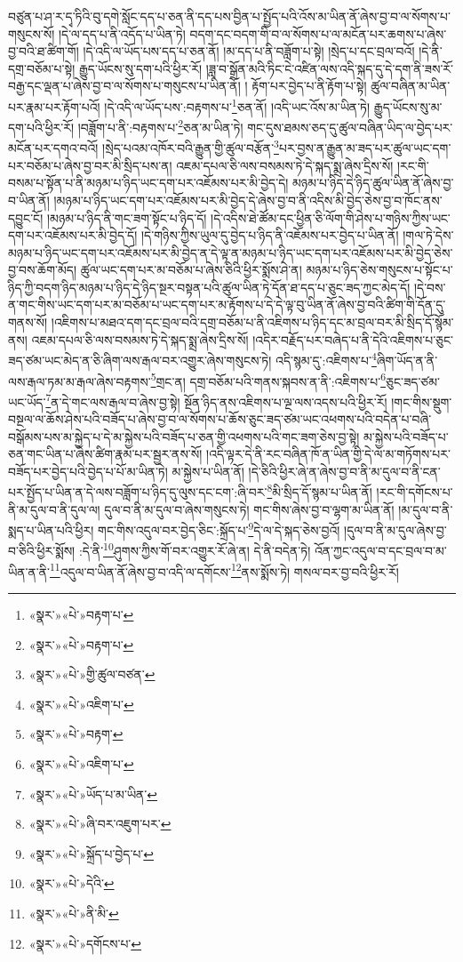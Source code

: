 བཙུན་པ་ཤ་ར་དྭ་ཏིའི་བུ་དགེ་སློང་དད་པ་ཅན་ནི་དད་པས་བྱིན་པ་སྤྱོད་པའི་འོས་མ་ཡིན་ནོ་ཞེས་བྱ་བ་ལ་སོགས་པ་གསུངས་སོ། །དེ་ལ་དད་པ་ནི་འདོད་པ་ཡིན་ཏེ། བདག་དང་བདག་གི་བ་ལ་སོགས་པ་ལ་མངོན་པར་ཆགས་པ་ཞེས་བྱ་བའི་ཐ་ཚིག་གོ། །དེ་འདི་ལ་ཡོད་པས་དད་པ་ཅན་ནོ། །མ་དད་པ་ནི་བཟློག་པ་སྟེ། །སྲེད་པ་དང་བྲལ་བའོ། །དེ་ནི་དགྲ་བཅོམ་པ་སྟེ། རྒྱུད་ཡོངས་སུ་དག་པའི་ཕྱིར་རོ། །ཟླ་བ་སྒྲོན་མའི་ཏིང་ངེ་འཛིན་ལས་འདི་སྐད་དུ་དེ་དག་ནི་ཟས་རོ་བརྒྱ་དང་ལྡན་པ་ཞེས་བྱ་བ་ལ་སོགས་པ་གསུངས་པ་ཡིན་ནོ། །
རྟོག་པར་བྱེད་པ་ནི་རྟོག་པ་སྟེ། ཚུལ་བཞིན་མ་ཡིན་པར་རྣམ་པར་རྟོག་པའོ། །དེ་འདི་ལ་ཡོད་པས་:བརྟགས་པ་\footnote{«སྣར་»«པེ་»བརྟག་པ་}ཅན་ནོ། །འདི་ཡང་འོས་མ་ཡིན་ཏེ། རྒྱུད་ཡོངས་སུ་མ་དག་པའི་ཕྱིར་རོ། །བཟློག་པ་ནི་:བརྟགས་པ་\footnote{«སྣར་»«པེ་»བརྟག་པ་}ཅན་མ་ཡིན་ཏེ། གང་དུས་ཐམས་ཅད་དུ་ཚུལ་བཞིན་ཡིད་ལ་བྱེད་པར་མངོན་པར་དགའ་བའོ། །སྲེད་པའམ་འཁོར་བའི་རྒྱུན་གྱི་ཚུལ་བརྩོན་\footnote{«སྣར་»«པེ་»གྱི་ཚུལ་བཙན་}པར་བྱས་ན་རྒྱུན་མ་ཟད་པར་ཚུལ་ཡང་དག་པར་བཅོམ་པ་ཞེས་བྱ་བར་མི་སྲིད་པས་ན། འཇམ་དཔལ་ཅི་ལས་བསམས་ཏེ་དེ་སྐད་སྨྲ་ཞེས་དྲིས་སོ། །རང་གི་བསམ་པ་སྟོན་པ་ནི་མཉམ་པ་ཉིད་ཡང་དག་པར་འཇོམས་པར་མི་བྱེད་དེ། མཉམ་པ་ཉིད་དེ་ཉིད་ཚུལ་ཡིན་ནོ་ཞེས་བྱ་བ་ཡིན་ནོ། །མཉམ་པ་ཉིད་ཡང་དག་པར་འཇོམས་པར་མི་བྱེད་དེ་ཞེས་བྱ་བ་ནི་འདིས་མི་བྱེད་ཅེས་བྱ་བ་ཁོང་ནས་དབྱུང་ངོ། །མཉམ་པ་ཉིད་ནི་གང་ཟག་སྟོང་པ་ཉིད་དོ། །དེ་འདིས་ཐེ་ཚོམ་དང་ཕྱིན་ཅི་ལོག་གི་ཤེས་པ་གཉིས་ཀྱིས་ཡང་དག་པར་འཇོམས་པར་མི་བྱེད་དོ། །དེ་གཉིས་ཀྱིས་ཡུལ་དུ་བྱེད་པ་ཉིད་ནི་འཇོམས་པར་བྱེད་པ་ཡིན་ནོ། །གལ་ཏེ་དེས་མཉམ་པ་ཉིད་ཡང་དག་པར་འཇོམས་པར་མི་བྱེད་ན་དེ་ལྟ་ན་མཉམ་པ་ཉིད་ཡང་དག་པར་འཇོམས་པར་མི་བྱེད་ཅེས་བྱ་བས་ཆོག་མོད། ཚུལ་ཡང་དག་པར་མ་བཅོམ་པ་ཞེས་ཅིའི་ཕྱིར་སྨོས་ཤེ་ན། མཉམ་པ་ཉིད་ཅེས་གསུངས་པ་སྟོང་པ་ཉིད་ཀྱི་བདག་ཉིད་མཉམ་པ་ཉིད་དེ་ཉིད་སྔར་བསྟན་པའི་ཚུལ་ཡིན་ཏེ་དོན་ཐ་དད་པ་ཅུང་ཟད་ཀྱང་མེད་དོ། །དེ་བས་ན་གང་གིས་ཡང་དག་པར་མ་བཅོམ་པ་ཡང་དག་པར་མ་རྟོགས་པ་དེ་དེ་ལྟ་བུ་ཡིན་ནོ་ཞེས་བྱ་བའི་ཚིག་གི་དོན་དུ་གནས་སོ། །འཇིགས་པ་མཐའ་དག་དང་བྲལ་བའི་དགྲ་བཅོམ་པ་ནི་འཇིགས་པ་ཉིད་དང་མ་བྲལ་བར་མི་སྲིད་དོ་སྙོམ་ནས། འཇམ་དཔལ་ཅི་ལས་བསམས་ཏེ་དེ་སྐད་སྨྲ་ཞེས་དྲིས་སོ། །འདིར་བརྗོད་པར་བཞེད་པ་ནི་དེའི་འཇིགས་པ་ཅུང་ཟད་ཙམ་ཡང་མེད་ན་ཅི་ཞིག་ལས་རྒལ་བར་འགྱུར་ཞེས་གསུངས་ཏེ། འདི་སྙམ་དུ་:འཇིགས་པ་\footnote{«སྣར་»«པེ་»འཇིག་པ་}ཞིག་ཡོད་ན་ནི་ལས་རྒལ་ཏམ་མ་རྒལ་ཞེས་བརྟགས་\footnote{«སྣར་»«པེ་»བརྟག་}གྲང་ན། དགྲ་བཅོམ་པའི་གནས་སྐབས་ན་ནི་:འཇིགས་པ་\footnote{«སྣར་»«པེ་»འཇིག་པ་}ཅུང་ཟད་ཙམ་ཡང་ཡོད་\footnote{«སྣར་»«པེ་»ཡོད་པ་མ་ཡིན་}ན་དེ་གང་ལས་རྒལ་བ་ཞེས་བྱ་སྟེ། སྔོན་ཉིད་ནས་འཇིགས་པ་ལྔ་ལས་འདས་པའི་ཕྱིར་རོ། །གང་གིས་སྡུག་བསྔལ་ལ་ཆོས་ཤེས་པའི་བཟོད་པ་ཞེས་བྱ་བ་ལ་སོགས་པ་ཆོས་ཅུང་ཟད་ཙམ་ཡང་འཕགས་པའི་བདེན་པ་བཞི་བསྒོམས་པས་མ་སྐྱེད་པ་དེ་མ་སྐྱེས་པའི་བཟོད་པ་ཅན་གྱི་འཕགས་པའི་གང་ཟག་ཅེས་བྱ་སྟེ། མ་སྐྱེས་པའི་བཟོད་པ་ཅན་གང་ཡིན་པ་ཞེས་ཚིག་རྣམ་པར་སྦྱར་ནས་སོ། །འདི་ལྟར་དེ་ནི་རང་བཞིན་ཁོ་ན་ཡིན་གྱི་དེ་ལ་མ་གཏོགས་པར་བཟོད་པར་བྱེད་པའི་བྱེད་པ་པོ་མ་ཡིན་ཏེ། མ་སྐྱེས་པ་ཡིན་ནོ། །དེ་ཅིའི་ཕྱིར་ཞེ་ན་ཞེས་བྱ་བ་ནི་མ་དུལ་བ་ནི་ངན་པར་སྤྱོད་པ་ཡིན་ན་དེ་ལས་བཟློག་པ་ཉིད་དུ་ལུས་དང་ངག་:ཞི་བར་\footnote{«སྣར་»«པེ་»ཞི་བར་འཇུག་པར་}མི་སྲིད་དོ་སྙམ་པ་ཡིན་ནོ། །རང་གི་དགོངས་པ་ནི་མ་དུལ་བ་ནི་དུལ་ལ། དུལ་བ་ནི་མ་དུལ་བ་ཞེས་གསུངས་ཏེ། གང་གིས་ཞེས་བྱ་བ་ལྷག་མ་ཡིན་ནོ། །མ་དུལ་བ་ནི་སྨད་པ་ཡིན་པའི་ཕྱིར། གང་གིས་འདུལ་བར་བྱེད་ཅིང་:སྐྲོད་པ་\footnote{«སྣར་»«པེ་»སྐྲོད་པ་བྱེད་པ་}དེ་ལ་དེ་སྐད་ཅེས་བྱའོ། །དུལ་བ་ནི་མ་དུལ་ཞེས་བྱ་བ་ཅིའི་ཕྱིར་སྨོས། :དེ་ནི་\footnote{«སྣར་»«པེ་»དེའི་}ཤུགས་ཀྱིས་གོ་བར་འགྱུར་རོ་ཞེ་ན། དེ་ནི་བདེན་ཏེ། འོན་ཀྱང་འདུལ་བ་དང་བྲལ་བ་མ་ཡིན་ན་ནི་\footnote{«སྣར་»«པེ་»ནི་མི་}འདུལ་བ་ཡིན་ནོ་ཞེས་བྱ་བ་འདི་ལ་དགོངས་\footnote{«སྣར་»«པེ་»དགོངས་པ་}ནས་སྨོས་ཏེ། གསལ་བར་བྱ་བའི་ཕྱིར་རོ། 